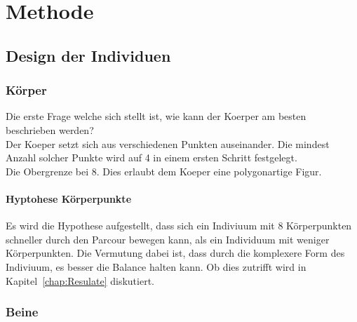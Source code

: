 %
%


\chapter{Methode}

  \section{Design der Individuen}

    \subsection{Körper\label{sub:Körper}}

      Die erste Frage welche sich stellt ist, wie kann der Koerper am besten beschrieben werden? \\
      Der Koeper setzt sich aus verschiedenen Punkten auseinander.
      Die mindest Anzahl solcher Punkte wird auf 4 in einem ersten Schritt festgelegt. \\
      Die Obergrenze bei 8. Dies erlaubt dem Koeper eine polygonartige Figur.

      \subsubsection{Hyptohese Körperpunkte\label{subsub:hypoKp}}

        Es wird die Hypothese aufgestellt,
        dass sich ein Indiviuum mit 8 Körperpunkten schneller durch den Parcour bewegen kann,
        als ein Individuum mit weniger Körperpunkten.
        Die Vermutung dabei ist, dass durch die komplexere Form des Indiviuum, es besser die Balance halten kann.
        Ob dies zutrifft wird in Kapitel~\ref{chap:Resulate} diskutiert.

    \subsection{Beine\label{sub:Beine}}

